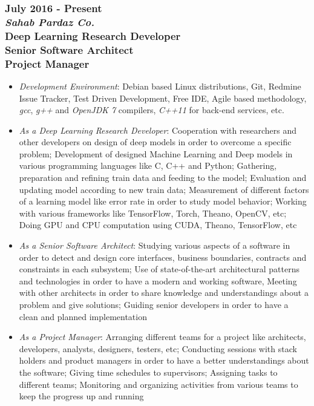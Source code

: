 \documentclass[10pt,a4paper]{article}
\begin{document}
\subsubsection{{July 2016 - Present} \\ \textnormal {\textit {Sahab Pardaz Co.}} \\ {Deep Learning Research Developer \\ Senior Software Architect \\ Project Manager}}
  \setlength{\leftskip}{0.5cm}
  \setlength{\rightskip}{1cm}
  \begin{itemize}
    \setlength{\rightskip}{1cm}
    \setlength\itemsep{0em}
    \item \small \textit {Development Environment}: Debian based Linux distributions, Git, Redmine Issue Tracker, Test Driven Development, Free IDE, Agile based methodology, \textit {gcc}, \textit{g++} and \textit{OpenJDK 7} compilers, \textit{C++11} for back-end services, etc.
    \item \small \textit {As a Deep Learning Research Developer}: Cooperation with researchers and other developers on design of deep models in order to overcome a specific problem; Development of designed Machine Learning and Deep models in various programming languages like C, C++ and Python; Gathering, preparation and refining train data and feeding to the model; Evaluation and updating model according to new train data; Measurement of different factors of a learning model like error rate in order to study model behavior; Working with various frameworks like TensorFlow, Torch, Theano, OpenCV, etc; Doing GPU and CPU computation using CUDA, Theano, TensorFlow, etc
    \item \small \textit {As a Senior Software Architect}: Studying various aspects of a software in order to detect and design core interfaces, business boundaries, contracts and constraints in each subsystem; Use of state-of-the-art architectural patterns and technologies in order to have a modern and working software, Meeting with other architects in order to share knowledge and understandings about a problem and give solutions; Guiding senior developers in order to have a clean and planned implementation
    \item \small \textit {As a Project Manager}: Arranging different teams for a project like architects, developers, analysts, designers, testers, etc; Conducting sessions with stack holders and product managers in order to have a better understandings about the software; Giving time schedules to supervisors; Assigning tasks to different teams; Monitoring and organizing activities from various teams to keep the progress up and running
  \end{itemize}
  \setlength{\leftskip}{0pt}
  \setlength{\rightskip}{0cm}
  
\end{document}
